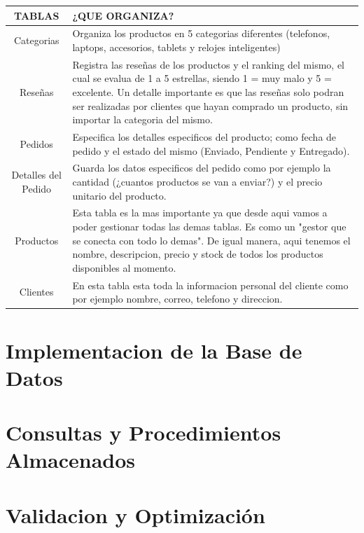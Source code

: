\documentclass[10pt,letterpaper]{article}
\begin{document}
\begin{table}[H]%
    \begin{tabular}{| c |p{9cm} |} %
        \hline
        TABLAS & ¿QUE ORGANIZA? \\
        \hline
        Categorias                 & Organiza los productos en 5 categorias diferentes
                                      (telefonos, laptops, accesorios, tablets y relojes inteligentes)\\ \hline
        
        Reseñas                    & Registra las reseñas de los productos y el ranking del mismo, el cual se evalua de
                                      1 a 5 estrellas, siendo 1 = muy malo y 5 = excelente. Un detalle importante es que
                                      las reseñas solo podran ser realizadas por clientes que hayan comprado un producto,
                                      sin importar la categoria del mismo.\\ \hline

        Pedidos                    & Especifica los detalles especificos del producto; como fecha de pedido y el estado
                                      del mismo (Enviado, Pendiente y Entregado).\\ \hline
        
        Detalles del Pedido        & Guarda los datos especificos del pedido como por ejemplo
                                      la cantidad (¿cuantos productos se van a enviar?) y el precio unitario del producto.\\ \hline
        
        Productos                  & Esta tabla es la mas importante ya que desde aqui vamos a poder gestionar todas las demas tablas.
                                      Es como un "gestor que se conecta con todo lo demas". De igual manera, aqui tenemos el nombre, descripcion, precio y stock de todos los
                                      productos disponibles al momento.\\ \hline

        Clientes                   & En esta tabla esta toda la informacion personal del cliente como por ejemplo nombre, correo, telefono y direccion.\\ \hline

    \end{tabular}
\end{table}

\section{Implementacion de la Base de Datos}

\section{Consultas y Procedimientos Almacenados}

\section{Validacion y Optimización}
\end{document}
